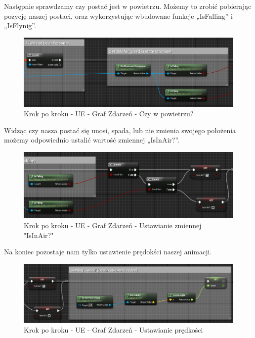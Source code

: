 \documentclass[openright]{xmgr}
\begin{document}
Następnie sprawdzamy czy postać jest w powietrzu. Możemy to zrobić pobierając pozycję naszej postaci, oraz wykorzystując wbudowane funkcje „IsFalling” i „IsFlynig”.

\begin{figure}[!htb]
    \begin{center}
    \includegraphics[scale=0.6]{Screeny/UeKrokPoKroku/UE-EventGraph-IsInAir.png}
    \end{center}
    \caption{Krok po kroku - UE -  Graf Zdarzeń - Czy w powietrzu?}
\end{figure}

Widząc czy nasza postać się unosi, spada, lub nie zmienia swojego położenia możemy odpowiednio ustalić wartość zmiennej „IsInAir?”.

\begin{figure}[!htb]
    \begin{center}
    \includegraphics[scale=0.6]{Screeny/UeKrokPoKroku/UE-EventGraph-SetIsInAir.png}
    \end{center}
    \caption{Krok po kroku - UE -  Graf Zdarzeń - Ustawianie zmiennej "IsInAir?"}
\end{figure}

\newpage
Na koniec pozostaje nam tylko ustawienie prędokści naszej animacji.

\begin{figure}[!htb]
    \begin{center}
    \includegraphics[scale=0.6]{Screeny/UeKrokPoKroku/UE-EventGraph-Speed.png}
    \end{center}
    \caption{Krok po kroku - UE -  Graf Zdarzeń - Ustawianie prędkości}
\end{figure}
\end{document}
